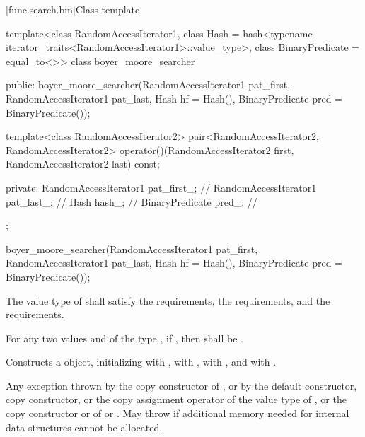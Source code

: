 [func.search.bm]{Class template }

%
\begin{codeblock}
template<class RandomAccessIterator1,
         class Hash = hash<typename iterator_traits<RandomAccessIterator1>::value_type>,
         class BinaryPredicate = equal_to<>>
  class boyer_moore_searcher {
  public:
    boyer_moore_searcher(RandomAccessIterator1 pat_first,
                         RandomAccessIterator1 pat_last,
                         Hash hf = Hash(),
                         BinaryPredicate pred = BinaryPredicate());

    template<class RandomAccessIterator2>
      pair<RandomAccessIterator2, RandomAccessIterator2>
        operator()(RandomAccessIterator2 first, RandomAccessIterator2 last) const;

  private:
    RandomAccessIterator1 pat_first_;   // \expos
    RandomAccessIterator1 pat_last_;    // \expos
    Hash hash_;                         // \expos
    BinaryPredicate pred_;              // \expos
  };
\end{codeblock}

%
\begin{itemdecl}
boyer_moore_searcher(RandomAccessIterator1 pat_first,
                     RandomAccessIterator1 pat_last,
                     Hash hf = Hash(),
                     BinaryPredicate pred = BinaryPredicate());
\end{itemdecl}

\begin{itemdescr}
\pnum
\requires
The value type of  shall satisfy the  requirements,
the  requirements, and the  requirements.

\pnum
\requires
For any two values  and  of the type ,
if , then  shall be .

\pnum
\effects
Constructs a  object, initializing  with ,
 with ,  with , and  with .

\pnum
\throws
Any exception thrown by the copy constructor of ,
or by the default constructor, copy constructor, or the copy assignment operator of the value type of ,
or the copy constructor or  of  or .
May throw  if additional memory needed for internal data structures cannot be allocated.
\end{itemdescr}

